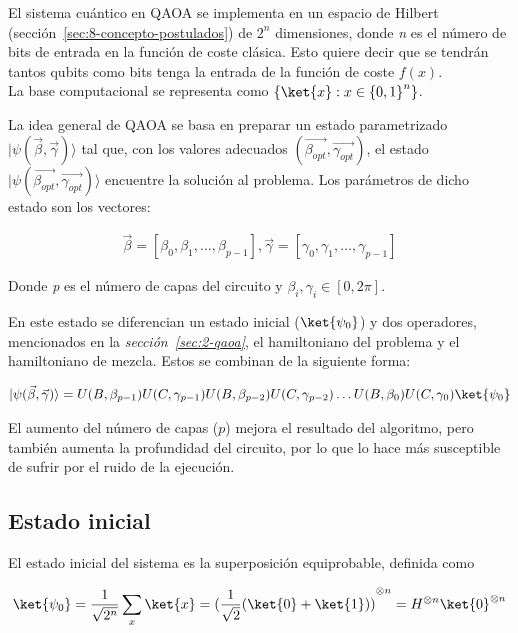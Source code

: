 El sistema cuántico en QAOA se implementa en un espacio de Hilbert (sección~\ref{sec:8-concepto-postulados}) de $2^n$ dimensiones, donde \textit{n} es el número de bits de entrada en la función de coste clásica. Esto quiere decir que se tendrán tantos qubits como bits tenga la entrada de la función de coste $f(x)$.
\\
La base computacional se representa como $\{\ket{x} : x \in {\{0, 1\}}^n\}$.

La idea general de QAOA se basa en preparar un estado parametrizado \(\lvert \psi(\vec{\beta}, \vec{\gamma})\rangle\) tal que, con los valores adecuados \( (\vec{\beta_{opt}}, \vec{\gamma_{opt}}) \), el estado \(\lvert\psi(\vec{\beta_{opt}}, \vec{\gamma_{opt}})\rangle\) encuentre la solución al problema. Los parámetros de dicho estado son los vectores:

\begin{align}
  \vec{\beta} = [\beta_0, \beta_1, \ldots , \beta_{p-1}], \vec{\gamma} = [\gamma_0, \gamma_1, \ldots , \gamma_{p-1}]
\end{align}

Donde \textit{p} es el número de capas del circuito y $\beta_i, \gamma_i \in{[0, 2\pi]}$.

En este estado se diferencian un estado inicial ($\ket{\psi_0}$) y dos operadores, mencionados en la \textit{sección~\ref{sec:2-qaoa}}, el hamiltoniano del problema y el hamiltoniano de mezcla.
Estos se combinan de la siguiente forma:

\begin{align}
  \lvert \psi(\vec{\beta}, \vec{\gamma})\rangle = U(B, \beta_{p-1})U(C, \gamma_{p-1})U(B, \beta_{p-2})U(C, \gamma_{p-2}) \ldots U(B, \beta_0)U(C, \gamma_0) \ket{\psi_0}
\end{align}

El aumento del número de capas ($p$) mejora el resultado del algoritmo, pero también aumenta la profundidad del circuito, por lo que lo hace más susceptible de sufrir por el ruido de la ejecución.

\subsection{Estado inicial}
El estado inicial del sistema es la superposición equiprobable, definida como

\begin{align}
  \ket{\psi_0} = \frac{1}{\sqrt{2^n}} \sum_x\ket{x}
  = {(\frac{1}{\sqrt{2}} (\ket{0} + \ket{1}))}^{\otimes n}
  = H^{\otimes n} \ket{0}^{\otimes n}
\end{align}

